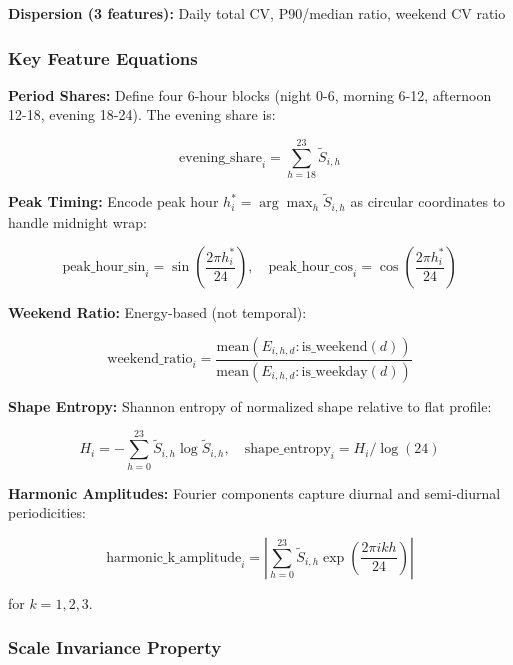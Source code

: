 \documentclass[11pt,a4paper]{article}
\begin{document}
\textbf{Dispersion (3 features):} Daily total CV, P90/median ratio, weekend CV ratio

\subsubsection{Key Feature Equations}

\textbf{Period Shares:} Define four 6-hour blocks (night 0-6, morning 6-12, afternoon 12-18, evening 18-24). The evening share is:

\begin{equation}
\text{evening\_share}_i = \sum_{h=18}^{23} \tilde{S}_{i,h}
\end{equation}

\textbf{Peak Timing:} Encode peak hour $h^*_i = \arg\max_h \tilde{S}_{i,h}$ as circular coordinates to handle midnight wrap:

\begin{equation}
\text{peak\_hour\_sin}_i = \sin\left(\frac{2\pi h^*_i}{24}\right), \quad
\text{peak\_hour\_cos}_i = \cos\left(\frac{2\pi h^*_i}{24}\right)
\end{equation}

\textbf{Weekend Ratio:} Energy-based (not temporal):

\begin{equation}
\text{weekend\_ratio}_i = \frac{\text{mean}(E_{i,h,d} : \text{is\_weekend}(d))}{\text{mean}(E_{i,h,d} : \text{is\_weekday}(d))}
\end{equation}

\textbf{Shape Entropy:} Shannon entropy of normalized shape relative to flat profile:

\begin{equation}
H_i = -\sum_{h=0}^{23} \tilde{S}_{i,h} \log \tilde{S}_{i,h}, \quad
\text{shape\_entropy}_i = H_i / \log(24)
\end{equation}

\textbf{Harmonic Amplitudes:} Fourier components capture diurnal and semi-diurnal periodicities:

\begin{equation}
\text{harmonic\_k\_amplitude}_i = \left| \sum_{h=0}^{23} \tilde{S}_{i,h} \exp\left(\frac{2\pi i k h}{24}\right) \right|
\end{equation}

for $k = 1, 2, 3$.

\subsubsection{Scale Invariance Property}
\end{document}
